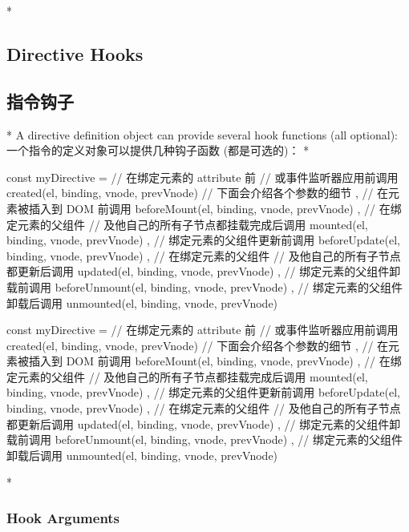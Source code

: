 \begin{paracol}{2}
 
\switchcolumn[0]*%
\subsection{Directive Hooks}
\switchcolumn
\subsection{指令钩子}
\switchcolumn[0]*%
A directive definition object can provide several hook functions (all
optional):
\switchcolumn
一个指令的定义对象可以提供几种钩子函数 (都是可选的)：
\switchcolumn[0]*%
\begin{codeJs}
const myDirective = {
  // 在绑定元素的 attribute 前
  // 或事件监听器应用前调用
  created(el, binding, vnode, prevVnode) {
    // 下面会介绍各个参数的细节
  },
  // 在元素被插入到 DOM 前调用
  beforeMount(el, binding, vnode, prevVnode) {},
  // 在绑定元素的父组件
  // 及他自己的所有子节点都挂载完成后调用
  mounted(el, binding, vnode, prevVnode) {},
  // 绑定元素的父组件更新前调用
  beforeUpdate(el, binding, vnode, prevVnode) {},
  // 在绑定元素的父组件
  // 及他自己的所有子节点都更新后调用
  updated(el, binding, vnode, prevVnode) {},
  // 绑定元素的父组件卸载前调用
  beforeUnmount(el, binding, vnode, prevVnode) {},
  // 绑定元素的父组件卸载后调用
  unmounted(el, binding, vnode, prevVnode) {}
}
\end{codeJs}
\switchcolumn
\begin{codeJs}
const myDirective = {
  // 在绑定元素的 attribute 前
  // 或事件监听器应用前调用
  created(el, binding, vnode, prevVnode) {
    // 下面会介绍各个参数的细节
  },
  // 在元素被插入到 DOM 前调用
  beforeMount(el, binding, vnode, prevVnode) {},
  // 在绑定元素的父组件
  // 及他自己的所有子节点都挂载完成后调用
  mounted(el, binding, vnode, prevVnode) {},
  // 绑定元素的父组件更新前调用
  beforeUpdate(el, binding, vnode, prevVnode) {},
  // 在绑定元素的父组件
  // 及他自己的所有子节点都更新后调用
  updated(el, binding, vnode, prevVnode) {},
  // 绑定元素的父组件卸载前调用
  beforeUnmount(el, binding, vnode, prevVnode) {},
  // 绑定元素的父组件卸载后调用
  unmounted(el, binding, vnode, prevVnode) {}
}
\end{codeJs}
\switchcolumn[0]*%
\subsubsection{Hook Arguments}
\switchcolumn

\end{paracol}
